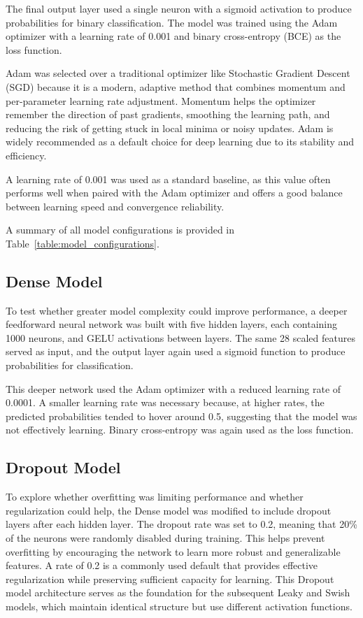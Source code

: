 \documentclass{article}      %
\begin{document}
The final output layer used a single neuron with a sigmoid activation to produce probabilities for binary classification. The model was trained using the Adam optimizer with a learning rate of 0.001 and binary cross-entropy (BCE) as the loss function.

Adam was selected over a traditional optimizer like Stochastic Gradient Descent (SGD) because it is a modern, adaptive method that combines momentum and per-parameter learning rate adjustment. Momentum helps the optimizer remember the direction of past gradients, smoothing the learning path, and reducing the risk of getting stuck in local minima or noisy updates. Adam is widely recommended as a default choice for deep learning due to its stability and efficiency.

A learning rate of 0.001 was used as a standard baseline, as this value often performs well when paired with the Adam optimizer and offers a good balance between learning speed and convergence reliability.

A summary of all model configurations is provided in Table~\ref{table:model_configurations}.

\subsection{Dense Model}

To test whether greater model complexity could improve performance, a deeper feedforward neural network was built with five hidden layers, each containing 1000 neurons, and GELU activations between layers. The same 28 scaled features served as input, and the output layer again used a sigmoid function to produce probabilities for classification.

This deeper network used the Adam optimizer with a reduced learning rate of 0.0001. A smaller learning rate was necessary because, at higher rates, the predicted probabilities tended to hover around 0.5, suggesting that the model was not effectively learning. Binary cross-entropy was again used as the loss function.

\subsection{Dropout Model}

To explore whether overfitting was limiting performance and whether regularization could help, the Dense model was modified to include dropout layers after each hidden layer. The dropout rate was set to 0.2, meaning that 20\% of the neurons were randomly disabled during training. This helps prevent overfitting by encouraging the network to learn more robust and generalizable features. A rate of 0.2 is a commonly used default that provides effective regularization while preserving sufficient capacity for learning. This Dropout model architecture serves as the foundation for the subsequent Leaky and Swish models, which maintain identical structure but use different activation functions.
\end{document}
